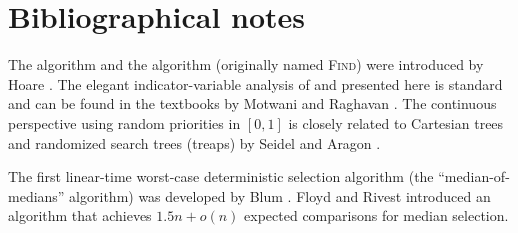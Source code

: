 \section{Bibliographical notes}

The \QuickSort algorithm and the \QuickSelect algorithm (originally named
\textsc{Find}) were introduced by Hoare \cite{h-a6q-61, h-a6f-61,
   h-q-62}.  The elegant indicator-variable analysis of \QuickSort and
\QuickSelect presented here is standard and can be found in the textbooks
by Motwani and Raghavan \cite{mr-ra-95}.  The continuous perspective
using random priorities in $[0,1]$ is closely related to Cartesian trees
and randomized search trees (treaps) by Seidel and Aragon
\cite{sa-rst-96}.

The first linear-time worst-case deterministic selection algorithm (the ``median-of-medians'' algorithm)
was developed by Blum \etal \cite{bfprt-tbs-73}.
Floyd and Rivest \cite{fr-etbs-75, fr-a4s-75} introduced an algorithm
that achieves $1.5n + o(n)$ expected comparisons for median selection.


\ChapterEnd{}




